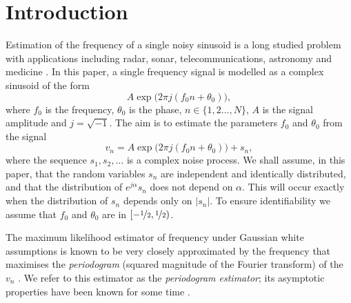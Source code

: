 \section{Introduction}

Estimation of the frequency of a single noisy sinusoid is a long studied
problem with applications including radar, sonar, telecommunications,
astronomy and medicine \cite{Quinn2001, Rife1974}.  In this paper, a single
frequency signal is modelled as a complex sinusoid of the form
\begin{equation} \label{eq_sinusoidal}
A \exp{\big(2\pi j \left(f_0 n + \theta_0 \right)\big)},
\end{equation}
where $f_0$ is the frequency, $\theta_0$ is the phase, $n \in \{1,2\dots,N\}$, $A$
is the signal amplitude and $j = \sqrt{-1}$.  The aim is to estimate the
parameters $f_0$ and $\theta_0$ from the signal
\begin{equation} \label{eq_sigmodel_noise}
v_n = A \exp{\big(2\pi j \left(f_0 n + \theta_0 \right)\big)} + s_n,
\end{equation} 
where the sequence $s_1, s_2, \dots$ is a complex noise process. We shall assume, in
this paper, that the random variables $s_n$ are independent and identically
distributed, and that the distribution of $e^{j \alpha} s_n$ does not depend
on $\alpha$. This will occur exactly when the distribution of $s_n$
depends only on $\vert s_n \vert$.  To ensure identifiability we assume that
$f_0$ and $\theta_0$ are in $[-\nicefrac{1}{2}, \nicefrac{1}{2})$.

The maximum likelihood estimator of frequency under Gaussian white assumptions
is known to be very closely approximated by the frequency that maximises the
\emph{periodogram} (squared magnitude of the Fourier transform) of the $v_n$
\cite{Quinn2001}.
We refer to this estimator as the \emph{periodogram estimator}; its
asymptotic properties have been known for some
time \cite{Quinn2001, Hannan1973, Walker1971}.

